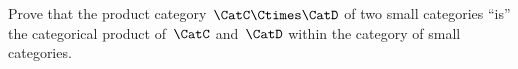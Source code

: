 \begin{gradedexercise}
    Prove that the product category~$\CatC \Ctimes \CatD$ of two small categories ``is'' the categorical product of~$\CatC$ and~$\CatD$ within the category of small categories.
\end{gradedexercise}

